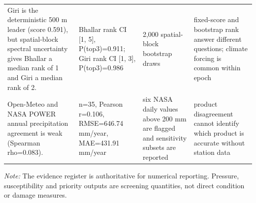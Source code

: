 \begin{longtable}{p{}p{}p{}p{}}
Giri is the deterministic 500 m leader (score 0.591), but spatial-block spectral uncertainty gives Bhallar a median rank of 1 and Giri a median rank of 2. & Bhallar rank CI [1, 5], P(top3)=0.911; Giri rank CI [1, 3], P(top3)=0.986 & 2,000 spatial-block bootstrap draws & fixed-score and bootstrap rank answer different questions; climate forcing is common within epoch \\
Open-Meteo and NASA POWER annual precipitation agreement is weak (Spearman rho=0.083). & n=35, Pearson r=0.106, RMSE=646.74 mm/year, MAE=431.91 mm/year & six NASA daily values above 200 mm are flagged and sensitivity subsets are reported & product disagreement cannot identify which product is accurate without station data \\
\end{longtable}
\noindent\textit{Note:} The evidence register is authoritative for numerical reporting. Pressure, susceptibility and priority outputs are screening quantities, not direct condition or damage measures.
\endgroup
